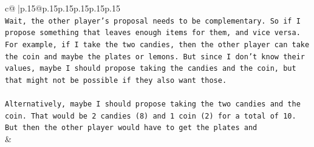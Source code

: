 \documentclass{article}
\begin{document}
{\begin{supertabular}{c@{$\;$}|p{.15\linewidth}@{}p{.15\linewidth}p{.15\linewidth}p{.15\linewidth}p{.15\linewidth}p{.15\linewidth}}
{{{\\ 
\texttt{Wait, the other player's proposal needs to be complementary. So if I propose something that leaves enough items for them, and vice versa. For example, if I take the two candies, then the other player can take the coin and maybe the plates or lemons. But since I don't know their values, maybe I should propose taking the candies and the coin, but that might not be possible if they also want those.} \\
\\ 
\texttt{Alternatively, maybe I should propose taking the two candies and the coin. That would be 2 candies (8) and 1 coin (2) for a total of 10. But then the other player would have to get the plates and} \\
            }
        }
    }
    & \\ \\


\end{supertabular}}
\end{document}
